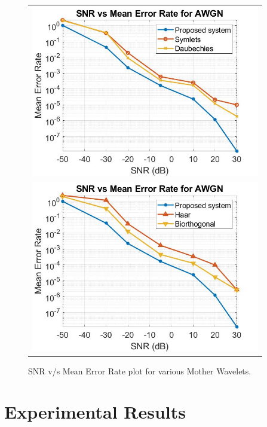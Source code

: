 \begin{figure}[htpb]
\centering
\begin{tabular}{c}
  \includegraphics[width=100mm]{error_rate_wavelets_db.jpg} \\
  \vspace{10mm}
  \includegraphics[width=100mm]{error_rate_wavelets.jpg} \\
\end{tabular}
\caption{SNR v/s Mean Error Rate plot for various Mother Wavelets.}
\label{fig:error_plot_wavelets}
\end{figure}

\newpage

\chapter{Experimental Results}

